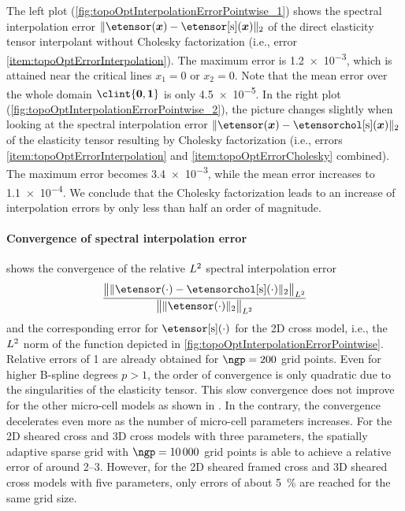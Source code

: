 The left plot (\cref{fig:topoOptInterpolationErrorPointwise_1})
shows the spectral interpolation error
$\norm[2]{\etensor(\*x) - \etensorintp(\*x)}$
of the direct elasticity tensor interpolant without Cholesky factorization
(i.e., error \ref{item:topoOptErrorInterpolation}).
The maximum error is \num{1.2e-3},
which is attained near the critical lines $x_1 = 0$ or $x_2 = 0$.
Note that the mean error over the whole domain $\clint{\*0, \*1}$
is only \num{4.5e-5}.
In the right plot (\cref{fig:topoOptInterpolationErrorPointwise_2}),
the picture changes slightly when looking at the spectral interpolation error
$\norm[2]{\etensor(\*x) - \etensorcholintp(\*x)}$
of the elasticity tensor resulting by Cholesky factorization
(i.e., errors \ref{item:topoOptErrorInterpolation} and
\ref{item:topoOptErrorCholesky} combined).
The maximum error becomes \num{3.4e-3},
while the mean error increases to \num{1.1e-4}.
We conclude that the Cholesky factorization leads to an increase
of interpolation errors by only less than half an order of magnitude.

\paragraph{Convergence of spectral interpolation error}

 shows
the convergence of the relative $L^2$ spectral interpolation error
\begin{equation}
  \frac{
    \normLtwoscaled{
      \vphantom{\big(}
      \norm[2]{\etensor({\cdot}) - \etensorcholintp({\cdot})}
    }
  }{
    \normLtwoscaled{
      \vphantom{\big(}
      \norm[2]{\etensor({\cdot})}
    }
  }
\end{equation}
and the corresponding error for $\etensorintp({\cdot})$
for the 2D cross model, i.e.,
the $L^2$ norm of the function depicted in
\cref{fig:topoOptInterpolationErrorPointwise}.
Relative errors of \SI{1}{\permille} are already obtained
for $\ngp = 200$ grid points.
Even for higher B-spline degrees $p > 1$,
the order of convergence is only quadratic
due to the singularities of the elasticity tensor.
This slow convergence does not improve for the other
micro-cell models as shown in
.
In the contrary, the convergence decelerates even more
as the number of micro-cell parameters increases.
For the 2D sheared cross and 3D cross models with three parameters,
the spatially adaptive sparse grid with $\ngp = \num{10000}$ grid points
is able to achieve a relative error of around \SIrange{2}{3}{\permille}.
However, for the 2D sheared framed cross and 3D sheared cross models
with five parameters, only errors of about \SI{5}{\percent} are reached
for the same grid size.

